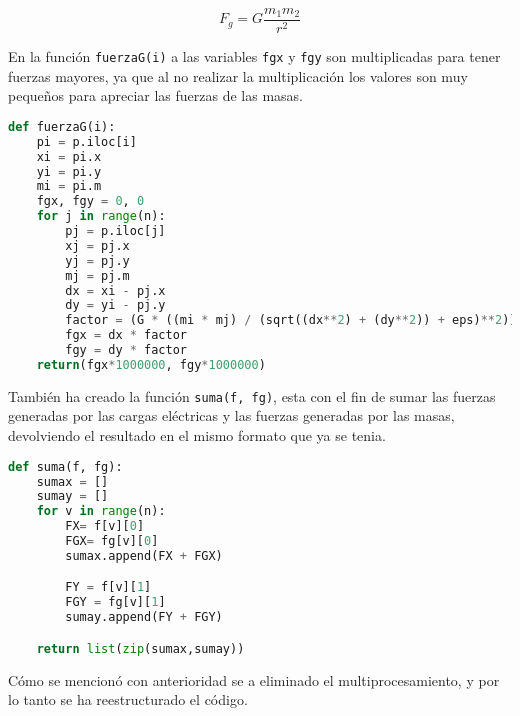 \documentclass{article}
\begin{document}
 \begin{equation}
 \label{eq:e1}
F_g= G\frac{m_1 m_2}{r^{2}} 
\end{equation}

En la función \texttt{fuerzaG(i)} a las variables \texttt{fgx} y \texttt{fgy} son multiplicadas para tener fuerzas mayores, ya que al no realizar la multiplicación los valores son muy pequeños para apreciar las fuerzas de las masas.\\
 
 \begin{lstlisting}[language=Python]
def fuerzaG(i):
    pi = p.iloc[i]
    xi = pi.x
    yi = pi.y
    mi = pi.m
    fgx, fgy = 0, 0
    for j in range(n):
        pj = p.iloc[j]
        xj = pj.x
        yj = pj.y
        mj = pj.m
        dx = xi - pj.x
        dy = yi - pj.y
        factor = (G * ((mi * mj) / (sqrt((dx**2) + (dy**2)) + eps)**2))
        fgx = dx * factor
        fgy = dy * factor
    return(fgx*1000000, fgy*1000000)
 \end{lstlisting}
 
 
 También ha creado la función \texttt{suma(f, fg)}, esta con el fin de sumar las fuerzas generadas por las cargas eléctricas y las fuerzas generadas por las masas, devolviendo el resultado en el mismo formato que ya se tenia.
 
 \begin{lstlisting}[language=Python]
def suma(f, fg):
    sumax = []
    sumay = []
    for v in range(n):
        FX= f[v][0]
        FGX= fg[v][0]
        sumax.append(FX + FGX)

        FY = f[v][1]
        FGY = fg[v][1]
        sumay.append(FY + FGY)

    return list(zip(sumax,sumay))
 \end{lstlisting}
 
 Cómo se mencionó con anterioridad se a eliminado el multiprocesamiento, y por lo tanto se ha  reestructurado el código.
 
\end{document}
